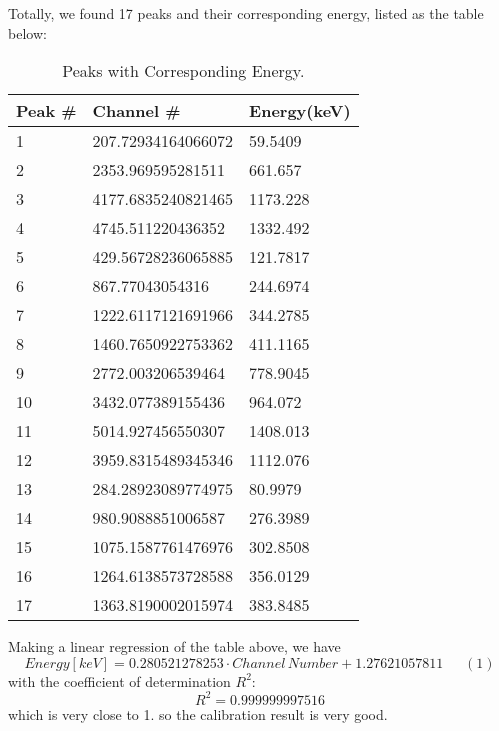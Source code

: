 Totally, we found 17 peaks and their corresponding energy, listed as the table below:

\begin{table}[h!]
  \begin{center}
    \caption{Peaks with Corresponding Energy.}
    \label{tab:table1}
    \begin{tabular}{l|l|l}
      \textbf{Peak \#} & \textbf{Channel \#} & \textbf{Energy(keV)}\\
      \hline
      1 & 207.72934164066072 & 59.5409\\
      2 & 2353.969595281511 & 661.657\\
      3 & 4177.6835240821465 & 1173.228\\
      4 & 4745.511220436352  & 1332.492\\
      5 & 429.56728236065885 & 121.7817\\
      6 & 867.77043054316  & 244.6974\\
      7 & 1222.6117121691966  & 344.2785\\
      8 & 1460.7650922753362  & 411.1165\\
      9 & 2772.003206539464  & 778.9045\\
      10 & 3432.077389155436 & 964.072\\
      11 & 5014.927456550307 & 1408.013\\
      12 & 3959.8315489345346 & 1112.076\\
      13 & 284.28923089774975 & 80.9979\\
      14 & 980.9088851006587  & 276.3989\\
      15 & 1075.1587761476976 & 302.8508\\
      16 & 1264.6138573728588 & 356.0129\\
      17 & 1363.8190002015974 & 383.8485\\
 
    \end{tabular}
  \end{center}
\end{table}
Making a linear regression of the table above, we have
\[Energy[keV]=0.280521278253 \cdot Channel\,Number+1.27621057811\,\,\,\,\,\,\,\,\,(1)\]
with the coefficient of determination ${R^2}$:
\[{R^2}=0.999999997516\]
which is very close to 1. so the calibration result is very good.


